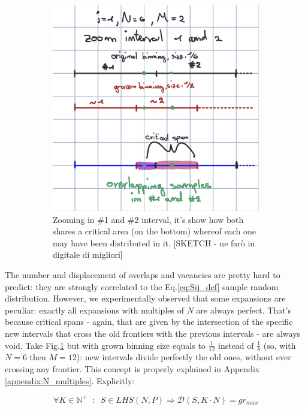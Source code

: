 \documentclass[12pt]{extarticle}
\newcommand{\meqref}[1]{Eq.\ref{#1}}
\newcommand{\mfigref}[1]{Fig.\ref{#1}}
\newcommand{\mappendixref}[1]{Appendix \ref{#1}}
\newcommand{\midcaption}[1]{
    \captionsetup{justification=centering}
    \caption{#1}
}
\begin{document}
\begin{figure}[h]
\begin{subfigure}[b]{0.45\textwidth}
{        	\includegraphics[width=\textwidth]{src/imgs/critical_span_zoom.jpg}
        	\caption{Zooming in \#1 and \#2 interval, it's show how both shares a critical area (on the bottom) whereof each one may have been distributed in it. [SKETCH - ne farò in digitale di migliori]}
        	\label{fig:critical_span2}
        }
    \end{subfigure}
    \midcaption{ }
    \label{fig:critical_span}
\end{figure}
 
The number and displacement of overlaps and vacancies are pretty hard to predict: they are strongly correlated to the \meqref{eq:Sij_def} sample random distribution. However, we experimentally observed that some expansions are peculiar: exactly all expansions with multiples of $N$ are always perfect. That's because critical spans - again, that are given by the intersection of the specific new intervals that cross the old frontiers with the previous intervals - are always void. Take \mfigref{fig:critical_span2} but with grown binning size equals to $\frac{1}{12}$ instead of $\frac{1}{8}$ (so, with $N = 6$ then $M = 12$): new intervals divide perfectly the old ones, without ever crossing any frontier. This concept is properly explained in \mappendixref{appendix:N_multiples}. Explicitly:

\begin{equation}
\label{eq:known_perfect_expansions}
\forall K \in \mathbb{N}^+ \;\; : \;\; S \in LHS(N, P) \Rightarrow \mathcal{D}(S, K \cdot N) = gr_{max}
\end{equation}
\end{document}
